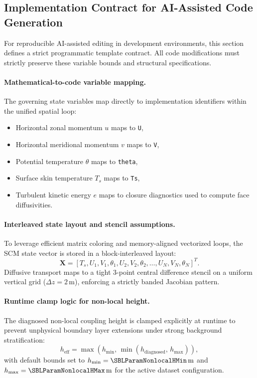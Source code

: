 \documentclass[11pt,letterpaper]{article}
\begin{document}
\subsection{Implementation Contract for AI-Assisted Code Generation}
\label{subsec:ai_impl_contract}

For reproducible AI-assisted editing in development environments, this section defines a strict programmatic template contract. All code modifications must strictly preserve these variable bounds and structural specifications.

\paragraph{Mathematical-to-code variable mapping.}
The governing state variables map directly to implementation identifiers within the unified spatial loop:
\begin{itemize}
    \item Horizontal zonal momentum $u$ maps to \texttt{U},
    \item Horizontal meridional momentum $v$ maps to \texttt{V},
    \item Potential temperature $\theta$ maps to \texttt{theta},
    \item Surface skin temperature $T_s$ maps to \texttt{Ts},
    \item Turbulent kinetic energy $e$ maps to closure diagnostics used to compute face diffusivities.
\end{itemize}

\paragraph{Interleaved state layout and stencil assumptions.}
To leverage efficient matrix coloring and memory-aligned vectorized loops, the SCM state vector is stored in a block-interleaved layout:
\begin{equation}
\mathbf{X} = [T_s, U_1, V_1, \theta_1, U_2, V_2, \theta_2, \dots, U_N, V_N, \theta_N]^T.
\label{eq:state_layout_interleaved}
\end{equation}
Diffusive transport maps to a tight 3-point central difference stencil on a uniform vertical grid ($\Delta z = 2\,\mathrm{m}$), enforcing a strictly banded Jacobian pattern.

\paragraph{Runtime clamp logic for non-local height.}
The diagnosed non-local coupling height is clamped explicitly at runtime to prevent unphysical boundary layer extensions under strong background stratification:
\begin{equation}
h_{\mathrm{eff}} = \max\left(h_{\min},\, \min\left(h_{\mathrm{diagnosed}},\, h_{\max}\right)\right),
\label{eq:nonlocal_h_clamp}
\end{equation}
with default bounds set to $h_{\min}=\SBLParamNonlocalHMin\,\mathrm{m}$ and $h_{\max}=\SBLParamNonlocalHMax\,\mathrm{m}$ for the active dataset configuration.
\end{document}
